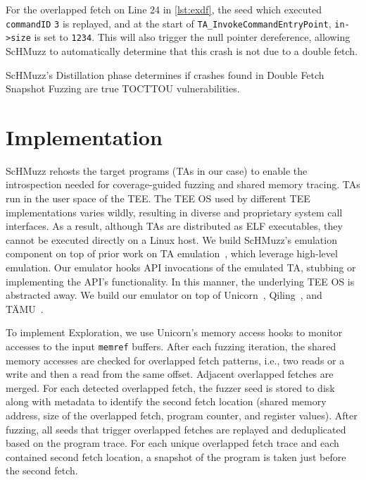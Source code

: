 \documentclass[conference]{IEEEtran}
\newcommand{\sysname}{ScHMuzz\xspace}
\newcommand{\stageone}{Exploration\xspace}
\newcommand{\stagetwo}{Double Fetch Snapshot Fuzzing\xspace}
\newcommand{\stagethree}{Distillation\xspace}
\begin{document}
For the overlapped fetch on Line 24 in \autoref{lst:exdf}, the seed which executed \texttt{commandID} \texttt{3} 
is replayed, and at the start of \texttt{TA\_InvokeCommandEntryPoint}, \texttt{in->size} is set to 
\texttt{1234}. This will also trigger the null pointer dereference, allowing \sysname to automatically 
determine that this crash is not due to a double fetch.

\begin{tcolorbox}
    \sysname's \stagethree phase determines if crashes found in \stagetwo are true 
    TOCTTOU vulnerabilities.
\end{tcolorbox} 

\section{Implementation}\label{sec:implementation}

\sysname rehosts the target programs (TAs in our case) to enable the introspection 
needed for coverage-guided fuzzing and shared memory tracing.
TAs run in the user space of the TEE. The TEE OS used by 
different TEE implementations varies wildly, resulting in diverse and proprietary system call 
interfaces. As a result, although TAs are distributed as ELF executables, they cannot 
be executed directly on a Linux host.
We build \sysname's emulation component on top of prior work on TA emulation~\cite{taemu,busch2020finding,fan2025qsee,qseecyberes,Thalium2023PivotingSecureWorld,Komaromy2021UnboxYourPhone,AdamskiGuilbonPeterlin2019SamsungTrustZone,Li2024DiveIntoAndroidTA}, 
which leverage high-level emulation. Our emulator hooks API invocations of the emulated TA, 
stubbing or implementing the API's functionality. In this manner, the underlying TEE OS is abstracted away.
We build our emulator on top of Unicorn~\cite{unicorn}, Qiling~\cite{qiling}, and TÄMU~\cite{taemu}.

To implement \stageone, we use Unicorn's memory access hooks to monitor accesses to the input \texttt{memref} buffers.
After each fuzzing iteration, the shared memory accesses are checked for overlapped fetch patterns, i.e., 
two reads or a write and then a read from the same offset. Adjacent overlapped fetches are merged. 
For each detected overlapped fetch, the fuzzer seed is stored 
to disk along with metadata to identify the second fetch location (shared memory address, size of the overlapped fetch, 
program counter, and register values). 
After fuzzing, all seeds that trigger overlapped fetches are replayed and deduplicated 
based on the program trace. For each unique overlapped fetch trace and each contained second fetch location, 
a snapshot of the program is taken just before the second fetch. 
\end{document}
